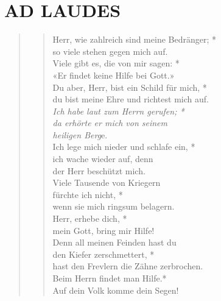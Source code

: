 
\section[MONTAG]{AD LAUDES}

\def\greinitialformat#1{{\fontsize{40}{40}\selectfont #1}}
\gresetfirstlineaboveinitial{\small \textcolor{red}{ Ps 3}}{}
\setaboveinitialseparation{0.72mm}


\vspace{0.3cm}


\begin{quote}
\begin{verse}
Herr, wie zahlreich sind meine Bedränger; *\\
so viele stehen gegen mich auf.\\ 
\vin Viele gibt es, die von mir sagen: *\\ 
\vin «Er findet keine Hilfe bei Gott.» \\
Du aber, Herr, bist ein Schild für mich, *\\
du bist meine Ehre und richtest mich auf.\\ 
\vin \textit{Ich habe laut zum Herrn gerufen; *\\ 
\vin da erhörte er mich von seinem \\
\vin heiligen Berg}e.\\ 
Ich lege mich nieder und schlafe ein, *\\
ich wache wieder auf, denn\\
der Herr beschützt mich.\\ 
\vin Viele Tausende von Kriegern\\ 
\vin fürchte ich nicht, *\\ 
\vin wenn sie mich ringsum belagern.\\ 
Herr, erhebe dich, *\\
mein Gott, bring mir Hilfe! \\ 
\vin Denn all meinen Feinden hast du \\ 
\vin den Kiefer zerschmettert, *\\ 
\vin hast den Frevlern die Zähne zerbrochen.\\
Beim Herrn findet man Hilfe.*\\
Auf dein Volk komme dein Segen! \\
\end{verse}
\end{quote}

